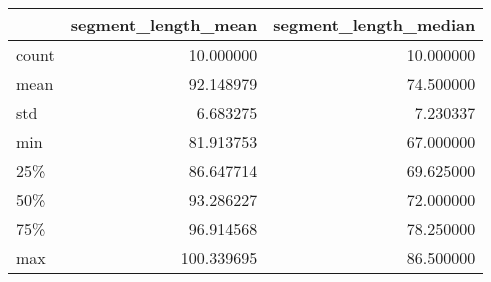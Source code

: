 \begin{table}[htb]
  \centering
  \begin{tabular}{lrr}
  \toprule
  {} &  segment\_length\_mean &  segment\_length\_median \\
  \midrule
  count &            10.000000 &              10.000000 \\
  mean  &            92.148979 &              74.500000 \\
  std   &             6.683275 &               7.230337 \\
  min   &            81.913753 &              67.000000 \\
  25\%   &            86.647714 &              69.625000 \\
  50\%   &            93.286227 &              72.000000 \\
  75\%   &            96.914568 &              78.250000 \\
  max   &           100.339695 &              86.500000 \\
  \bottomrule
  \end{tabular}
\end{table}
